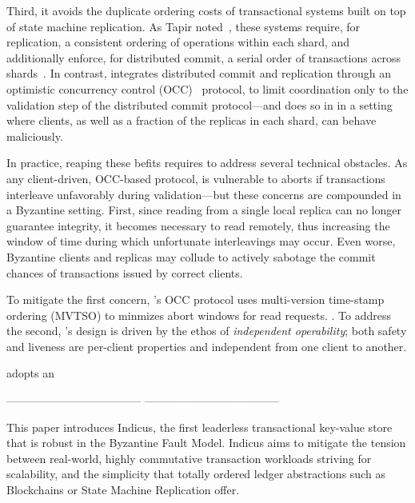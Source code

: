 Third, it avoids the duplicate ordering costs of transactional systems
built on top of state machine replication. As Tapir noted~\cite{},
these systems require, for replication, a consistent ordering of
operations within each shard, and additionally enforce, for
distributed commit, a serial order of transactions across
shards~\cite{}. In contrast, \sys{} integrates distributed commit and
replication through an optimistic concurrency control (OCC)~\cite{} protocol, to
limit coordination only to the validation step of the distributed commit
protocol---and does so in in a setting where clients, as well as a
fraction of the replicas in each shard, can behave maliciously.

In practice, reaping these befits requires to address several
technical obstacles. As any client-driven, OCC-based protocol, \sys
is vulnerable to aborts if transactions interleave unfavorably during
validation---but these concerns are compounded in a Byzantine
setting. First, since reading from a single local replica can no
longer guarantee integrity, it becomes necessary to read remotely,
thus increasing the window of time during which unfortunate
interleavings may occur. Even worse,  Byzantine clients and replicas may
collude to actively sabotage the commit chances of transactions issued
by correct clients.


To mitigate the first concern, \sys's OCC protocol uses multi-version
time-stamp ordering (MVTSO) to minmizes abort windows for read
requests.  .  To address the second, \sys's design is driven
by the ethos of \textit{independent operability}; both safety
 and liveness  are per-client properties and independent from one
client to another.

adopts an 



------------------------------------
------------------------------------



This paper introduces Indicus, the first leaderless transactional key-value store that is robust in the Byzantine Fault Model. Indicus aims to mitigate the tension between real-world, highly commutative transaction workloads striving for scalability, and the simplicity that totally ordered ledger abstractions such as Blockchains or State Machine Replication offer.

